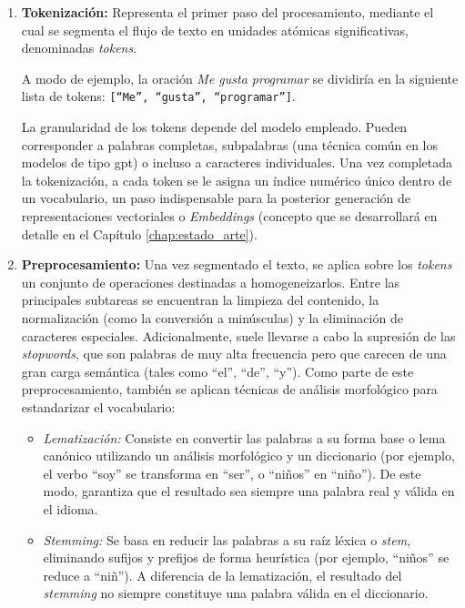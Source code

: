 \begin{enumerate}
    \item \textbf{Tokenización:} Representa el primer paso del procesamiento, mediante el cual se segmenta el flujo de texto en unidades atómicas significativas, denominadas \textit{tokens}.

          A modo de ejemplo, la oración \textit{Me gusta programar} se dividiría en la siguiente lista de tokens: \texttt{[``Me'', ``gusta'', ``programar'']}.

          La granularidad de los tokens depende del modelo empleado. Pueden corresponder a palabras completas, subpalabras (una técnica común en los modelos de tipo \gls{gpt}) o incluso a caracteres individuales. Una vez completada la tokenización, a cada token se le asigna un índice numérico único dentro de un vocabulario, un paso indispensable para la posterior generación de representaciones vectoriales o \textit{Embeddings} (concepto que se desarrollará en detalle en el Capítulo \ref{chap:estado_arte}).

    \item \textbf{Preprocesamiento:} Una vez segmentado el texto, se aplica sobre los \textit{tokens} un conjunto de operaciones destinadas a homogeneizarlos. Entre las principales subtareas se encuentran la limpieza del contenido, la normalización (como la conversión a minúsculas) y la eliminación de caracteres especiales. Adicionalmente, suele llevarse a cabo la supresión de las \textit{stopwords}, que son palabras de muy alta frecuencia pero que carecen de una gran carga semántica (tales como ``el'', ``de'', ``y''). Como parte de este preprocesamiento, también se aplican técnicas de análisis morfológico para estandarizar el vocabulario:
          \begin{itemize}
              \item \textit{Lematización:} Consiste en convertir las palabras a su forma base o lema canónico utilizando un análisis morfológico y un diccionario (por ejemplo, el verbo ``soy'' se transforma en ``ser'', o ``niños'' en ``niño''). De este modo, garantiza que el resultado sea siempre una palabra real y válida en el idioma.
              \item \textit{Stemming:} Se basa en reducir las palabras a su raíz léxica o \textit{stem}, eliminando sufijos y prefijos de forma heurística (por ejemplo, ``niños'' se reduce a ``niñ''). A diferencia de la lematización, el resultado del \textit{stemming} no siempre constituye una palabra válida en el diccionario.
          \end{itemize}


\end{enumerate}
